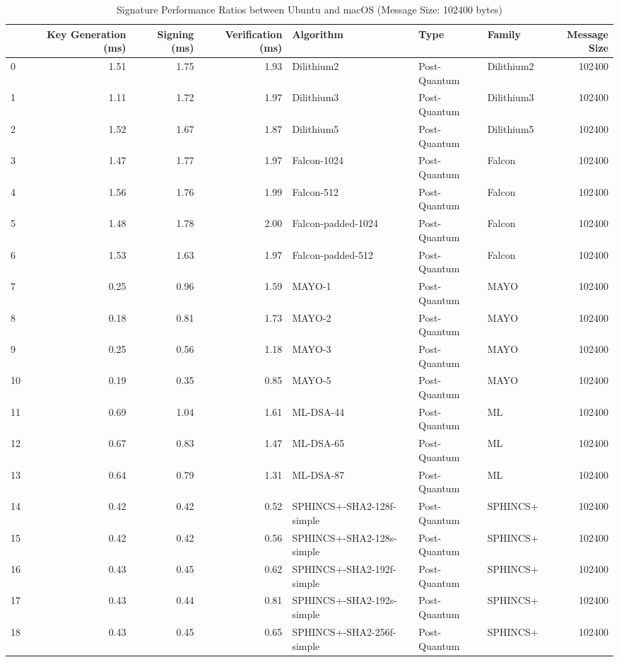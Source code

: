 \begin{table}
\caption{Signature Performance Ratios between Ubuntu and macOS (Message Size: 102400 bytes)}
\label{tab:desktop_sig_ratio_102400}
\begin{tabular}{lrrrlllr}
\toprule
 & Key Generation (ms) & Signing (ms) & Verification (ms) & Algorithm & Type & Family & Message Size \\
\midrule
0 & 1.51 & 1.75 & 1.93 & Dilithium2 & Post-Quantum & Dilithium2 & 102400 \\
1 & 1.11 & 1.72 & 1.97 & Dilithium3 & Post-Quantum & Dilithium3 & 102400 \\
2 & 1.52 & 1.67 & 1.87 & Dilithium5 & Post-Quantum & Dilithium5 & 102400 \\
3 & 1.47 & 1.77 & 1.97 & Falcon-1024 & Post-Quantum & Falcon & 102400 \\
4 & 1.56 & 1.76 & 1.99 & Falcon-512 & Post-Quantum & Falcon & 102400 \\
5 & 1.48 & 1.78 & 2.00 & Falcon-padded-1024 & Post-Quantum & Falcon & 102400 \\
6 & 1.53 & 1.63 & 1.97 & Falcon-padded-512 & Post-Quantum & Falcon & 102400 \\
7 & 0.25 & 0.96 & 1.59 & MAYO-1 & Post-Quantum & MAYO & 102400 \\
8 & 0.18 & 0.81 & 1.73 & MAYO-2 & Post-Quantum & MAYO & 102400 \\
9 & 0.25 & 0.56 & 1.18 & MAYO-3 & Post-Quantum & MAYO & 102400 \\
10 & 0.19 & 0.35 & 0.85 & MAYO-5 & Post-Quantum & MAYO & 102400 \\
11 & 0.69 & 1.04 & 1.61 & ML-DSA-44 & Post-Quantum & ML & 102400 \\
12 & 0.67 & 0.83 & 1.47 & ML-DSA-65 & Post-Quantum & ML & 102400 \\
13 & 0.64 & 0.79 & 1.31 & ML-DSA-87 & Post-Quantum & ML & 102400 \\
14 & 0.42 & 0.42 & 0.52 & SPHINCS+-SHA2-128f-simple & Post-Quantum & SPHINCS+ & 102400 \\
15 & 0.42 & 0.42 & 0.56 & SPHINCS+-SHA2-128s-simple & Post-Quantum & SPHINCS+ & 102400 \\
16 & 0.43 & 0.45 & 0.62 & SPHINCS+-SHA2-192f-simple & Post-Quantum & SPHINCS+ & 102400 \\
17 & 0.43 & 0.44 & 0.81 & SPHINCS+-SHA2-192s-simple & Post-Quantum & SPHINCS+ & 102400 \\
18 & 0.43 & 0.45 & 0.65 & SPHINCS+-SHA2-256f-simple & Post-Quantum & SPHINCS+ & 102400 \\

\end{tabular}
\end{table}
